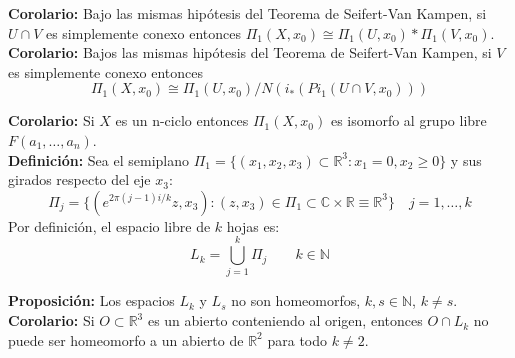 \documentclass{article}
\begin{document}
\textbf{Corolario:} Bajo las mismas hipótesis del Teorema de Seifert-Van Kampen, si $U\cap V$ es simplemente conexo entonces $\Pi_1(X,x_0)\cong \Pi_1(U,x_0)*\Pi_1(V,x_0)$. \\

\textbf{Corolario:} Bajos las mismas hipótesis del Teorema de Seifert-Van Kampen, si $V$ es simplemente conexo entonces 
\begin{equation*}
\Pi_1(X,x_0)\cong \Pi_1(U,x_0)/N(i_*(Pi_1(U\cap V,x_0)))
\end{equation*}

\textbf{Corolario:} Si $X$ es un n-ciclo entonces $\Pi_1(X,x_0)$ es isomorfo al grupo libre $F(a_1,\ldots,a_n)$. \\

\textbf{Definición:} Sea el semiplano $\Pi_1=\{(x_1,x_2,x_3)\subset \mathbb{R}^3:x_1=0,x_2\geq 0\}$ y sus girados respecto del eje $x_3$:
\begin{equation*}
\Pi_j=\{\left(e^{2\pi(j-1)i/k}z,x_3\right):(z,x_3)\in \Pi_1\subset \mathbb{C}\times \mathbb{R}\equiv \mathbb{R}^3\}\quad j=1,\ldots,k
\end{equation*}
Por definición, el espacio libre de $k$ hojas es:
\begin{equation*}
L_k=\bigcup_{j=1}^k\Pi_j\qquad k\in\mathbb{N}
\end{equation*}

\textbf{Proposición:} Los espacios $L_k$ y $L_s$ no son homeomorfos, $k,s\in \mathbb{N}$, $k\neq s$.\\

\textbf{Corolario:} Si $O\subset \mathbb{R}^3$ es un abierto conteniendo al origen, entonces $O\cap L_k$ no puede ser homeomorfo a un abierto de $\mathbb{R}^2$ para todo $k\neq 2$.
\end{document}
